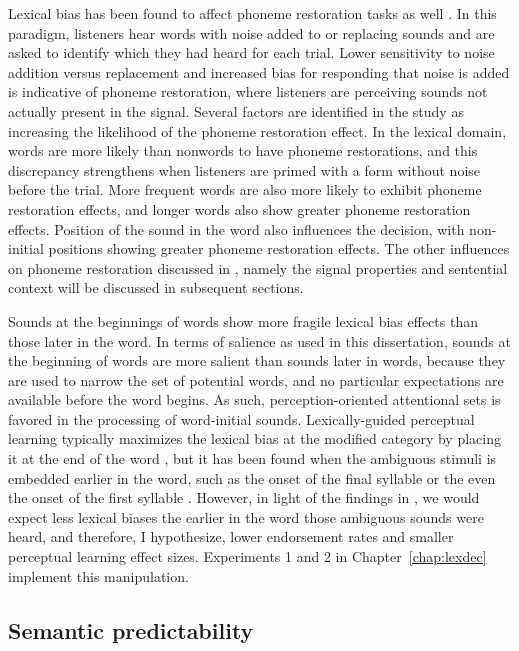 Lexical bias has been found to affect phoneme restoration tasks as well \citep{Samuel1981}.  
In this paradigm, listeners hear words with noise added to or replacing sounds and are asked to identify which they had heard for each trial.  
Lower sensitivity to noise addition versus replacement and increased bias for responding that noise is added is indicative of phoneme restoration, where listeners are perceiving sounds not actually present in the signal.  
Several factors are identified in the study as increasing the likelihood of the phoneme restoration effect.
In the lexical domain, words are more likely than nonwords to have phoneme restorations, and this discrepancy strengthens when listeners are primed with a form without noise before the trial.  
More frequent words are also more likely to exhibit phoneme restoration effects, and longer words also show greater phoneme restoration effects.  
Position of the sound in the word also influences the decision, with non-initial positions showing greater phoneme restoration effects. 
The other influences on phoneme restoration discussed in \citet{Samuel1981}, namely the signal properties and sentential context will be discussed in subsequent sections.

Sounds at the beginnings of words show more fragile lexical bias effects than those later in the word.  In terms of salience as used in this dissertation, sounds at the beginning of words are more salient than sounds later in words, because they are used to narrow the set of potential words, and no particular expectations are available before the word begins.  As such, perception-oriented attentional sets is favored in the processing of word-initial sounds.  Lexically-guided perceptual learning typically maximizes the lexical bias at the modified category by placing it at the end of the word \citep{Norris2003}, but it has been found when the ambiguous stimuli is embedded earlier in the word, such as the onset of the final syllable \citep{Kraljic2005, Kraljic2008, Kraljic2008a} or the even the onset of the first syllable \citep{Clare2014}.  However, in light of the findings in \citet{Pitt2012}, we would expect less lexical biases the earlier in the word those ambiguous sounds were heard, and therefore, I hypothesize, lower endorsement rates and smaller perceptual learning effect sizes.  
Experiments 1 and 2  in Chapter~\ref{chap:lexdec} implement this manipulation.

\subsection{Semantic predictability}
\label{sec:semanticpredictability}

